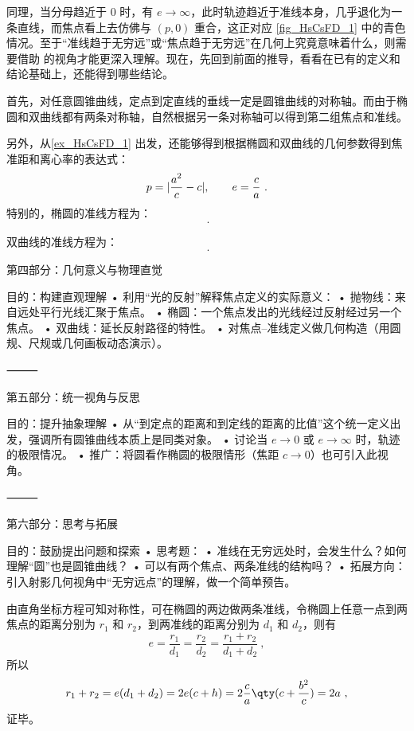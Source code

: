 同理，当分母趋近于 $0$ 时，有 $e \to \infty$，此时轨迹趋近于准线本身，几乎退化为一条直线，而焦点看上去仿佛与 $(p, 0)$ 重合，这正对应 \autoref{fig_HsCsFD_1} 中的青色情况。至于“准线趋于无穷远”或“焦点趋于无穷远”在几何上究竟意味着什么，则需要借助  的视角才能更深入理解。现在，先回到前面的推导，看看在已有的定义和结论基础上，还能得到哪些结论。

首先，对任意圆锥曲线，定点到定直线的垂线一定是圆锥曲线的对称轴。而由于椭圆和双曲线都有两条对称轴，自然根据另一条对称轴可以得到第二组焦点和准线。

另外，从\autoref{ex_HsCsFD_1} 出发，还能够得到根据椭圆和双曲线的几何参数得到焦准距和离心率的表达式：
\begin{equation}
p=|{\displaystyle a^2\over c}-c|,\qquad e={c\over a}~.
\end{equation}
特别的，椭圆的准线方程为：
\begin{equation}
~.
\end{equation}

双曲线的准线方程为：
\begin{equation}
~.
\end{equation}

第四部分：几何意义与物理直觉

目的：构建直观理解
	•	利用“光的反射”解释焦点定义的实际意义：
	•	抛物线：来自远处平行光线汇聚于焦点。
	•	椭圆：一个焦点发出的光线经过反射经过另一个焦点。
	•	双曲线：延长反射路径的特性。
	•	对焦点–准线定义做几何构造（用圆规、尺规或几何画板动态演示）。

⸻

第五部分：统一视角与反思

目的：提升抽象理解
	•	从“到定点的距离和到定线的距离的比值”这个统一定义出发，强调所有圆锥曲线本质上是同类对象。
	•	讨论当 $e \to 0$ 或 $e \to \infty$ 时，轨迹的极限情况。
	•	推广：将圆看作椭圆的极限情形（焦距 $c \to 0$）也可引入此视角。

⸻

第六部分：思考与拓展

目的：鼓励提出问题和探索
	•	思考题：
	•	准线在无穷远处时，会发生什么？如何理解“圆”也是圆锥曲线？
	•	可以有两个焦点、两条准线的结构吗？
	•	拓展方向：引入射影几何视角中“无穷远点”的理解，做一个简单预告。



由直角坐标方程可知对称性，可在椭圆的两边做两条准线，令椭圆上任意一点到两焦点的距离分别为 $r_1$ 和 $r_2$，到两准线的距离分别为 $d_1$ 和 $d_2$，则有
\begin{equation}
e = \frac{r_1}{d_1} = \frac{r_2}{d_2} = \frac{r_1 + r_2}{d_1 + d_2}~,
\end{equation}
所以
\begin{equation}
r_1 + r_2 = e(d_1+d_2) = 2e(c + h) = 2\frac{c}{a} \qty( c + \frac{b^2}{c} ) = 2a~,
\end{equation}
证毕。

